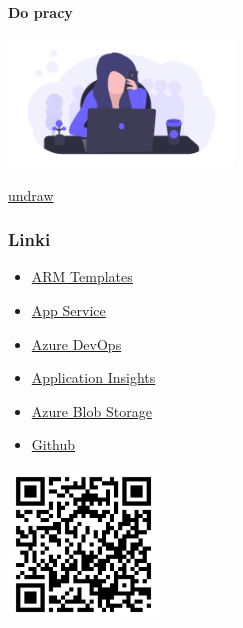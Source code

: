 \documentclass{beamer}
\newcommand{\source}[2]{
	\begin{flushright}
		\hfill {\scriptsize \href{#1}{#2}}	
	\end{flushright}
}
\begin{document}
\begin{frame}
\frametitle{\textbf{}}

\begin{minipage}{0.45\textwidth}
\begin{center}
    {\fontsize{50}{60}\selectfont \textbf{Do \vskip 10mm pracy}}
\end{center}
\end{minipage}
\begin{minipage}{0.45\textwidth}
    \hspace{15mm}
    \includegraphics[width=60mm]{working.png}
    \source{https://undraw.co/illustrations}{undraw}
\end{minipage}

\end{frame}

\begin{frame}
\frametitle{\textbf{Linki}}

\begin{itemize}
    \item \href{https://docs.microsoft.com/en-us/azure/azure-resource-manager/templates/overview}{ARM Templates}
    \item \href{https://docs.microsoft.com/en-us/azure/app-service/}{App Service}
    \item \href{https://azure.microsoft.com/en-us/services/devops/}{Azure DevOps}
    \item \href{https://docs.microsoft.com/en-us/azure/azure-monitor/app/app-insights-overview}{Application Insights}
    \item \href{https://docs.microsoft.com/en-us/azure/storage/blobs/storage-blobs-introduction}{Azure Blob Storage}
    \item \href{https://github.com/rafalpienkowski/azure-devops-integration}{Github}
\end{itemize}	

\includegraphics[width=40mm]{qr-code.png}

\end{frame}
\end{document}
